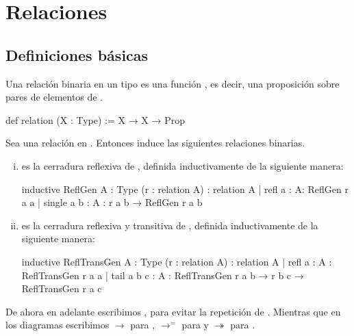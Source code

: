 \chapter{Relaciones}

\section{Definiciones básicas}

\begin{defn}
Una relación binaria en un tipo  es una función ,
es decir, una proposición sobre pares de elementos de .
\begin{leancode}
def relation (X : Type) := X → X → Prop
\end{leancode}
\end{defn}

\begin{defn}
Sea  una relación en . Entonces
 induce las siguientes relaciones binarias.

\begin{enumerate}[(i)]
\item {} es la cerradura reflexiva de , 
    definida inductivamente de la siguiente manera:
\begin{leancode}
inductive ReflGen {A : Type} (r : relation A) : relation A
  | refl {a : A}: ReflGen r a a
  | single {a b : A} : r a b → ReflGen r a b
\end{leancode}
\item {} es la cerradura reflexiva y transitiva de ,
    definida inductivamente de la siguiente manera:
\begin{leancode}
inductive ReflTransGen {A : Type} (r : relation A) : relation A
  | refl {a : A} : ReflTransGen r a a
  | tail {a b c : A} : ReflTransGen r a b → r b c → ReflTransGen r a c
\end{leancode}
\end{enumerate}
\end{defn}

De ahora en adelante escribimos ,
para evitar la repetición de . Mientras que
 en los diagramas escribimos $\to$ para ,
$\to^=$ para  y
$\twoheadrightarrow$ para .

